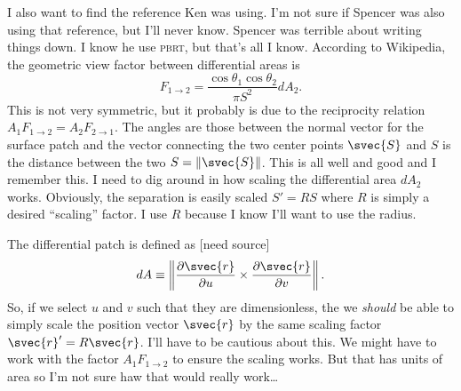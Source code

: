 I also want to find the reference Ken was using.  I'm not sure if
Spencer was also using that reference, but I'll never know.  Spencer was
terrible about writing things down.  I know he use \textsc{pbrt}, but
that's all I know.  According to Wikipedia, the geometric view factor
between differential areas is
\begin{equation}
    F_{1\to2} = \frac{\cos\theta_1\cos\theta_2}{\pi S^2} dA_2.
\end{equation}
This is not very symmetric, but it probably is due to the reciprocity
relation \(A_1F_{1\to2} = A_2F_{2\to1}\).  The angles are those between
the normal vector for the surface patch and the vector connecting the
two center points \(\svec{S}\) and \(S\) is the distance between the two
\(S = \lVert\svec{S}\rVert\).  This is all well and good and I remember
this.  I need to dig around in how scaling the differential area
\(dA_2\) works.  Obviously, the separation is easily scaled \(S' = R S\)
where \(R\) is simply a desired ``scaling'' factor.  I use \(R\) because
I know I'll want to use the radius.

The differential patch is defined as [need source]
\begin{equation}
    dA \equiv \left\lVert \frac{\partial\svec{r}}{\partial u} \times
    \frac{\partial\svec{r}}{\partial v} \right \rVert.
\end{equation}
So, if we select \(u\) and \(v\) such that they are dimensionless, the
we \emph{should} be able to simply scale the position vector
\(\svec{r}\) by the same scaling factor \(\svec{r}' = R \svec{r}\).
I'll have to be cautious about this.  We might have to work with the
factor \(A_1F_{1\to2}\) to ensure the scaling works.  But that has units
of area so I'm not sure haw that would really work\ldots

